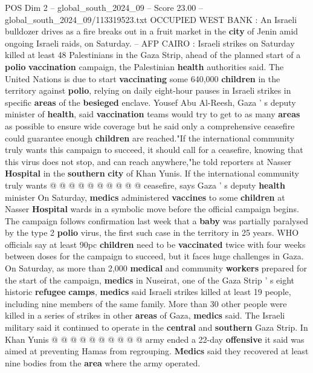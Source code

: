 \begin{textsample}{POS Dim 2 – global\_south\_2024\_09 – Score 23.00 – global\_south\_2024\_09/113319523.txt}  \label{ex:f2_pos_200}
OCCUPIED WEST BANK : An Israeli bulldozer drives as a fire breaks out in a fruit market in the \textbf{city} of Jenin amid ongoing Israeli raids, on Saturday. -- AFP CAIRO : Israeli strikes on Saturday killed at least 48 Palestinians in the Gaza Strip, ahead of the planned start of a \textbf{polio} \textbf{vaccination} campaign, the Palestinian \textbf{health} authorities said.
The United Nations is due to start \textbf{vaccinating} some 640,000 \textbf{children} in the territory against \textbf{polio}, relying on daily eight-hour pauses in Israeli strikes in specific \textbf{areas} of the \textbf{besieged} enclave.
Yousef Abu Al-Reesh, Gaza ' s deputy minister of \textbf{health}, said \textbf{vaccination} teams would try to get to as many \textbf{areas} as possible to ensure wide coverage but he said only a comprehensive ceasefire could guarantee enough \textbf{children} are reached."If the international community truly wants this campaign to succeed, it should call for a ceasefire, knowing that this virus does not stop, and can reach anywhere,"he told reporters at Nasser \textbf{Hospital} in the \textbf{southern} \textbf{city} of Khan Yunis.
If the international community truly wants @ @ @ @ @ @ @ @ @ @ ceasefire, says Gaza ' s deputy \textbf{health} minister On Saturday, \textbf{medics} administered \textbf{vaccines} to some \textbf{children} at Nasser \textbf{Hospital} wards in a symbolic move before the official campaign begins.
The campaign follows confirmation last week that a \textbf{baby} was partially paralysed by the type 2 \textbf{polio} virus, the first such case in the territory in 25 years.
WHO officials say at least 90pc \textbf{children} need to be \textbf{vaccinated} twice with four weeks between doses for the campaign to succeed, but it faces huge challenges in Gaza.
On Saturday, as more than 2,000 \textbf{medical} and community \textbf{workers} prepared for the start of the campaign, \textbf{medics} in Nuseirat, one of the Gaza Strip ' s eight historic \textbf{refugee} \textbf{camps}, \textbf{medics} said Israeli strikes killed at least 19 people, including nine members of the same family.
More than 30 other people were killed in a series of strikes in other \textbf{areas} of Gaza, \textbf{medics} said.
The Israeli military said it continued to operate in the \textbf{central} and \textbf{southern} Gaza Strip.
In Khan Yunis @ @ @ @ @ @ @ @ @ @ army ended a 22-day \textbf{offensive} it said was aimed at preventing Hamas from regrouping. \textbf{Medics} said they recovered at least nine bodies from the \textbf{area} where the army operated.

\end{textsample}
